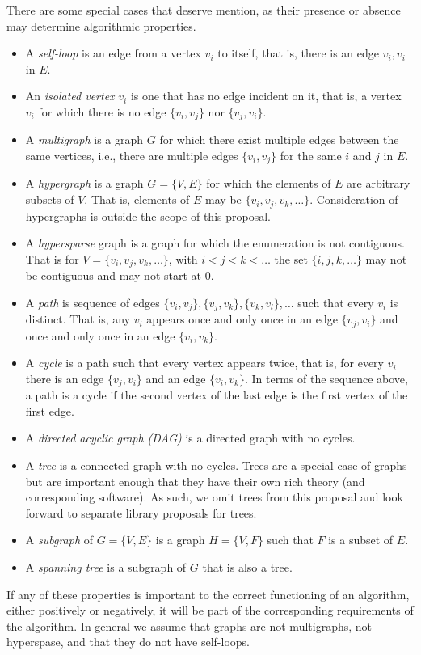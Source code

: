 There are some special cases that deserve mention, as their presence or absence may determine algorithmic properties.
\begin{itemize}
%
\item A \emph{self-loop} is an edge from a vertex $v_i$ to itself, that is, there is an edge ${v_i, v_i}$ in $E$.
%
\item An \emph{isolated vertex} $v_i$ is one that has no edge incident on it, that is, a vertex $v_i$ for which there is no edge $\{v_i, v_j\}$ nor $\{v_j, v_i\}$.
%
\item A \emph{multigraph} is a graph $G$ for which there exist multiple edges between the same vertices, i.e., there are
  multiple edges $\{v_i, v_j\}$ for the same $i$ and $j$ in $E$. 
%
\item A \emph{hypergraph} is a graph $G=\{V,E\}$ for which the elements of $E$ are arbitrary subsets of $V$.  That is,
  elements of $E$ may be $\{v_i, v_j, v_k, \ldots\}$.  Consideration of hypergraphs is outside the scope of this
  proposal.
\item A \emph{hypersparse} graph is a graph for which the enumeration is not contiguous.  That is for $V = \{v_i, v_j, v_k, \ldots\}$, with $i < j < k < \ldots$ the set $\{i, j, k, \ldots\}$ may not be contiguous and may not start at $0$.
\item A \emph{path} is sequence of edges $\{v_i, v_j\}, \{v_j, v_k\}, \{v_k, v_l\}, \ldots $ such that every $v_i$ is distinct.
  That is,
any $v_i$ appears once and only once in an edge $\{v_j, v_i\}$ and once and only once in an
edge $\{v_i, v_k\}$.
\item A \emph{cycle} is a path such that every vertex appears twice, that is, for every $v_i$ there is an edge
  $\{v_j, v_i\}$ and an 
edge $\{v_i, v_k\}$.  In terms of the sequence above, a path is a cycle if the second vertex of the last edge is the first vertex of the first edge.
\item  A \emph{directed acyclic graph (DAG)} is a directed graph with no cycles.
\item A \emph{tree} is a connected graph with no cycles.  Trees are a special case of graphs but are important enough that they have their own
  rich theory (and corresponding software).  As such, we omit trees from this proposal and look forward to
  separate library proposals for trees.
  \item A \emph{subgraph} of $G=\{V,E\}$ is a graph $H=\{V, F\}$ such that $F$ is a subset of $E$.
\item A \emph{spanning tree} is a subgraph of $G$ that is also a tree.
\end{itemize}
If any of these properties is important to the correct functioning of an algorithm, either positively or negatively, it will be part of the corresponding requirements of the algorithm.  In general we assume that graphs are not multigraphs, not hyperspase, and that they do not have self-loops.

